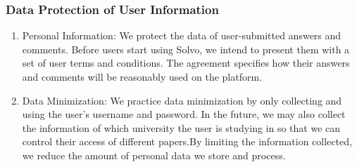 \documentclass[a4paper]{article}
\begin{document}
    \subsubsection*{Data Protection of User Information}
    \begin{enumerate}
        \item Personal Information: We protect the data of user-submitted answers and comments.
        Before users start using Solvo, we intend to present them with a set of user terms and conditions.
        The agreement specifies how their answers and comments will be reasonably used on the platform.
        \item Data Minimization: We practice data minimization by only collecting and using the user's username and password.
        In the future, we may also collect the information of which university the user is studying in so that we can control their access of different papers.By limiting the information collected, we reduce the amount of personal data we store and process.
    \end{enumerate}
\end{document}
